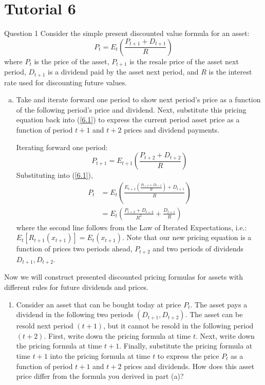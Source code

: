 \documentclass[a4paper]{article}
\begin{document}
\section{Tutorial 6}
	\begin{questionbox}{Question 1}
		Consider the simple present discounted value formula for an asset:
		\begin{equation}
			P_t = E_t \left( \frac{P_{t+1} + D_{t+1}}{R} \right) \label{6.1}
		\end{equation}
		where \( P_t \) is the price of the asset, \( P_{t+1} \) is the resale price of the asset next period, \( D_{t+1} \) is a dividend paid by the asset next period, and \( R \) is the interest rate used for discounting future values.
		\begin{enumerate}[(a)]
			\item Take  and iterate forward one period to show next period's price as a function of the following period's price and dividend. Next, substitute this pricing equation back into (\ref{6.1}) to express the current period asset price as a function of period \( t+1 \) and \( t+2 \) prices and dividend payments.
			\begin{explanationbox}
				Iterating forward one period:
				\[
					P_{t+1} = E_{t+1} \left( \frac{P_{t+2} + D_{t+2}}{R} \right)
				\]
				Substituting into (\ref{6.1}),
				\begin{align*}
					P_t &= E_t \left( \frac{E_{t+1} \left( \frac{P_{t+2} + D_{t+2}}{R} \right) + D_{t+1}}{R} \right)\\
					&=E_t \left( \frac{P_{t+2} + D_{t+2}}{R^2} + \frac{D_{t+1}}{R} \right)
				\end{align*}
				where the second line follows from the Law of Iterated Expectations, i.e.: \( E_t[R_{t+1}(x_{t+1})] = E_t(x_{t+1}) \). Note that our new pricing equation is a function of prices two periods ahead, \( P_{t+2} \) and two periods of dividends \( D_{t+1},D_{t+2} \).
			\end{explanationbox}
		\end{enumerate}
		Now we will construct presented discounted pricing formulas for assets with diﬀerent rules for future dividends and prices.
		\begin{enumerate}[resume*]
			\item Consider an asset that can be bought today at price \( P_t \). The asset pays a dividend in the following two periods \( (D_{t+1},D_{t+2}) \). The asset can be resold next period \( (t+1) \), but it cannot be resold in the following period \( (t+2) \). First, write down the pricing formula at time \( t \). Next, write down the pricing formula at time \( t+1 \). Finally, substitute the pricing formula at time \( t+1 \) into the pricing formula at time \( t \) to express the price \( P_t \) as a function of period \( t+1 \) and \( t+2 \) prices and dividends. How does this asset price differ from the formula you derived in part (a)?

\end{enumerate}
\end{questionbox}
\end{document}
